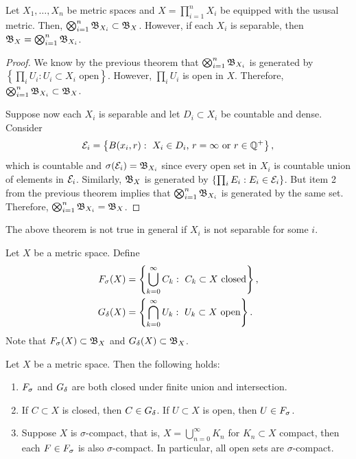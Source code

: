 \documentclass[a4paper]{article}
\renewcommand{\cupinfn}{\bigcup_{n=0}^\infty}
\renewcommand{\cupinfk}{\bigcup_{k=0}^\infty}
\renewcommand{\capinfk}{\bigcap_{k=0}^\infty}
\begin{document}
\begin{thm}
  Let $X_1, \dots, X_n$ be metric spaces and $X = \prod_{i=1}^n X_i$ be
  equipped with the ususal metric. Then, $\bigotimes_{i=1}^n \mathfrak{B}_{X_i}
    \subset \mathfrak{B}_X$. However, if each $X_i$ is separable, then $\mathfrak{B}_X =
    \bigotimes_{i=1}^n \mathfrak{B}_{X_i}$.
\end{thm}

\begin{proof}
  We know by the previous theorem that $\bigotimes_{i=1}^n \mathfrak{B}_{X_i}$ is
  generated by $\left\{ \prod_i U_i : U_i \subset X_i \text{ open}
    \right\}$. However, $\prod_i U_i$ is open in $X$. Therefore,
  $\bigotimes_{i=1}^n \mathfrak{B}_{X_i} \subset \mathfrak{B}_X$.

  Suppose now each $X_i$ is separable and let $D_i \subset X_i$ be
  countable and dense. Consider
  \[
    \mathcal{E}_i = \left\{ B(x_i, r): \text{ $X_i \in D_i$,
  $r = \infty$ or $r \in \mathbb{Q}^+$} \right\},
  \]
  which is countable and $\sigma(\mathcal{E}_i) = \mathfrak{B}_{X_i}$ since every open
  set in $X_i$ is countable union of elements in $\mathcal{E}_i$. Similarly,
  $\mathfrak{B}_X$ is generated by $\left\{ \prod_i E_i : E_i \in \mathcal{E}_i
  \right\}$. But item 2 from the previous theorem implies that
  $\bigotimes_{i=1}^n \mathfrak{B}_{X_i}$ is generated by the same set. Therefore,
  $\bigotimes_{i=1}^n \mathfrak{B}_{X_i} = \mathfrak{B}_X$.

\end{proof}

\begin{remark}
  The above theorem is not true in general if $X_i$ is not separable for
  some $i$.
\end{remark}

\begin{defi}
  Let $X$ be a metric space. Define
  \[
    \begin{aligned}
    \fs(X) &= \left\{ \cupinfk C_k : \text{ $C_k \subset X$
    closed} \right\}, \\
    \gd(X) &= \left\{ \capinfk U_k : \text{ $U_k \subset X$
    open} \right\}.
    \end{aligned}
  \]
  Note that $F_\sigma(X) \subset \mathfrak{B}_X$ and $G_\delta(X) \subset \mathfrak{B}_X$.
\end{defi}

\begin{thm}
  Let $X$ be a metric space. Then the following holds:
  \begin{enumerate}
    \item $F_\sigma$ and $G_\delta$ are both closed under finite
          union and intersection.
    \item If $C \subset X$ is closed, then $C \in G_\delta$. If $U \subset X$
          is open, then $U \in F_\sigma$.
    \item Suppose $X$ is $\sigma$-compact, that is, $X = \cupinfn K_n$ for
          $K_n \subset X$ compact, then each $F \in F_\sigma$ is also
          $\sigma$-compact. In particular, all open sets are
          $\sigma$-compact.
  \end{enumerate}
\end{thm}
\end{document}

